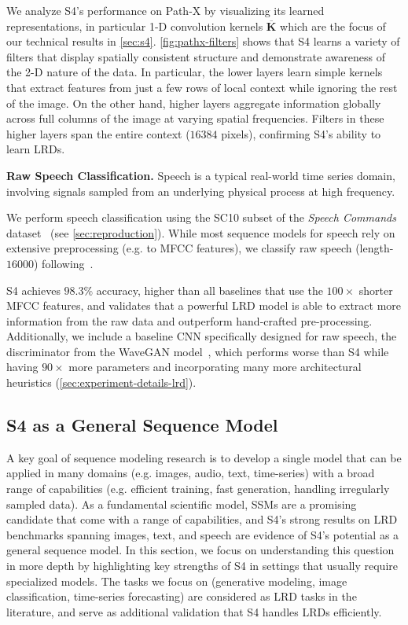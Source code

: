 We analyze S4's performance on Path-X by visualizing its learned representations, in particular 1-D convolution kernels \( \bm{\overline{K}} \)
which are the focus of our technical results in \ref{sec:s4}.
\ref{fig:pathx-filters} shows that S4 learns a variety of filters that display spatially consistent structure and demonstrate awareness of the 2-D nature of the data. In particular, the lower layers learn simple kernels that extract features from just a few rows of local context while ignoring the rest of the image. On the other hand, higher layers aggregate information globally across full columns of the image at varying spatial frequencies. Filters in these higher layers span the entire context ($16384$ pixels), confirming S4's ability to learn LRDs.

\textbf{Raw Speech Classification.} Speech is a typical real-world time series domain, involving signals sampled from an underlying physical process at high frequency.

We perform speech classification using the SC10 subset of the \emph{Speech Commands} dataset~\citep{Warden2018SpeechCA} (see \ref{sec:reproduction}).
While most sequence models for speech rely on extensive preprocessing (e.g. to MFCC features), we classify raw speech (length-$16000$) following~\citet{romero2021ckconv}.

S4 achieves $98.3\%$ accuracy, higher than all baselines that use the $100\times$ shorter MFCC features, and validates that a powerful LRD model is able to extract more information from the raw data and outperform hand-crafted pre-processing. Additionally, we include a baseline CNN specifically designed for raw speech, the discriminator from the WaveGAN model~\citep{Donahue2019AdversarialAS}, which performs worse than S4 while having $90\times$ more parameters and incorporating many more architectural heuristics (\ref{sec:experiment-details-lrd}).

\subsection{S4 as a General Sequence Model}
\label{sec:experiments-general}

A key goal of sequence modeling research is to develop a single model that can be applied in many domains (e.g. images, audio, text, time-series) with a broad range of capabilities (e.g. efficient training, fast generation, handling irregularly sampled data). As a fundamental scientific model, SSMs are a promising candidate that come with a range of capabilities, and S4's strong results on LRD benchmarks spanning images, text, and speech are evidence of S4's potential as a general sequence model. In this section, we focus on understanding this question in more depth by highlighting key strengths of S4 in settings that usually require specialized models. The tasks we focus on (generative modeling, image classification, time-series forecasting) are considered as LRD tasks in the literature, and serve as additional validation that S4 handles LRDs efficiently.

